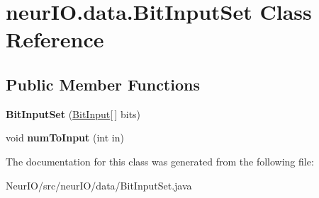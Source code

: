 \hypertarget{classneur_i_o_1_1data_1_1_bit_input_set}{}\section{neur\+I\+O.\+data.\+Bit\+Input\+Set Class Reference}
\label{classneur_i_o_1_1data_1_1_bit_input_set}
\subsection*{Public Member Functions}
\begin{DoxyCompactItemize}
\item 
\mbox{\label{classneur_i_o_1_1data_1_1_bit_input_set_ae38251ed876140dad186e6acdcb091ac}} 
{\bfseries Bit\+Input\+Set} (\hyperlink{classneur_i_o_1_1data_1_1_bit_input}{Bit\+Input}\mbox{[}$\,$\mbox{]} bits)
\item 
\mbox{\label{classneur_i_o_1_1data_1_1_bit_input_set_a87bf7c7fc9c81fd74438054facecd7a9}} 
void {\bfseries num\+To\+Input} (int in)
\end{DoxyCompactItemize}


The documentation for this class was generated from the following file\+:\begin{DoxyCompactItemize}
\item 
Neur\+I\+O/src/neur\+I\+O/data/Bit\+Input\+Set.\+java\end{DoxyCompactItemize}
